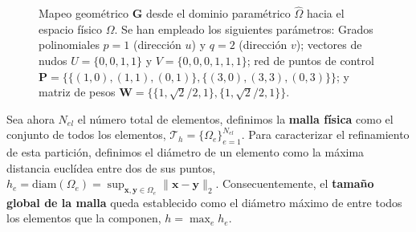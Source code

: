 \documentclass[11pt]{book}
\theoremstyle{plain} %
\theoremstyle{definition} %
\theoremstyle{definition} %
\begin{document}
\begin{figure}[htbp]

    \vspace{-0.3cm}


    \caption{Mapeo geométrico $\mathbf{G}$ desde el dominio paramétrico $\hat{\Omega}$ hacia el espacio físico $\Omega$. Se han empleado los siguientes parámetros: Grados polinomiales $p=1$ (dirección $u$) y $q=2$ (dirección $v$); vectores de nudos $U = \{0, 0, 1, 1\}$ y $V = \{0, 0, 0, 1, 1, 1\}$; red de puntos de control $\mathbf{P} = \{\{(1,0), (1,1), (0,1)\}, \{(3,0), (3,3), (0,3)\}\}$; y matriz de pesos $\mathbf{W} = \{\{1, \sqrt{2}/2, 1\}, \{1, \sqrt{2}/2, 1\}\}$.}
    \label{fig:mapping_ejemplo}
    \vspace{-0.2cm}

\end{figure}


Sea ahora $N_{el}$ el número total de elementos, definimos la \textbf{malla física} como el conjunto de todos los elementos, $\mathcal{T}_h = \{ \Omega_e \}_{e=1}^{N_{el}}$.
Para caracterizar el refinamiento de esta partición, definimos el diámetro de un elemento como la máxima distancia euclídea entre dos de sus puntos, $h_e = \text{diam}(\Omega_e) = \sup_{\mathbf{x}, \mathbf{y} \in \Omega_e} \| \mathbf{x} - \mathbf{y} \|_2$.
Consecuentemente, el \textbf{tamaño global de la malla} queda establecido como el diámetro máximo de entre todos los elementos que la componen, $h = \max_{e} h_e$.
\end{document}
